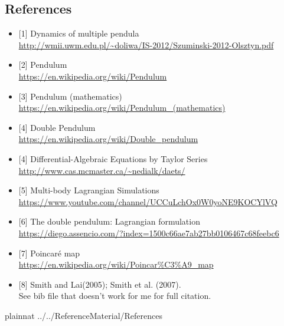 \documentclass[12pt]{article}
\begin{document}


\newpage

\subsection*{References}\label{ssec:ref}
\begin{itemize}
\item{[1]} Dynamics of multiple pendula \\\url{http://wmii.uwm.edu.pl/~doliwa/IS-2012/Szuminski-2012-Olsztyn.pdf}
\item{[2]} Pendulum \\\url{https://en.wikipedia.org/wiki/Pendulum}
\item{[3]} Pendulum (mathematics)
\\\url{https://en.wikipedia.org/wiki/Pendulum_(mathematics)}
\item{[4]} Double Pendulum
\\\url{https://en.wikipedia.org/wiki/Double_pendulum}\item{[4]}
Differential-Algebraic Equations by Taylor Series
\\\url{http://www.cas.mcmaster.ca/~nedialk/daets/}
\item{[5]} Multi-body Lagrangian Simulations
\\\url{https://www.youtube.com/channel/UCCuLchOx0W0yoNE9KOCYlVQ}
\item{[6]} The double pendulum: Lagrangian formulation
\\\url{https://diego.assencio.com/?index=1500c66ae7ab27bb0106467c68feebc6}
\item{[7]} Poincaré map
\\\url{https://en.wikipedia.org/wiki/Poincar%C3%A9_map}
\item{[8]} Smith and Lai(2005); Smith et al. (2007). \\
See bib file that doesn't work for me for full citation.
\end{itemize}

 {plainnat}
 {../../ReferenceMaterial/References}
\end{document}
